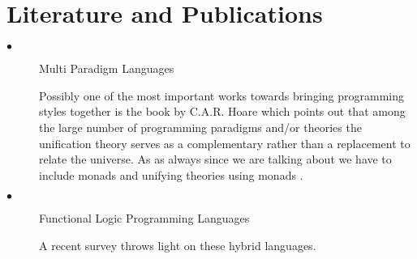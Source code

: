 \documentclass[thesis-solanki.tex]{subfiles}
\begin{document}
\section{Literature and Publications}
\begin{description}
\item[$\bullet$] Multi Paradigm Languages
\par Possibly one of the most important works towards bringing programming styles together is the book by C.A.R. Hoare \cite{hoare1998unifying} which points out that among the large number of programming paradigms and/or theories the unification theory serves as a complementary rather than a replacement to relate the universe. As as always since we are talking about  we have to include monads and unifying theories using monads \cite{gibbons2013unifying}.
 

\item[$\bullet$] Functional Logic Programming Languages

\par A recent survey \cite{hanus2007multi} throws light on these hybrid languages. 


\end{description}
\end{document}
